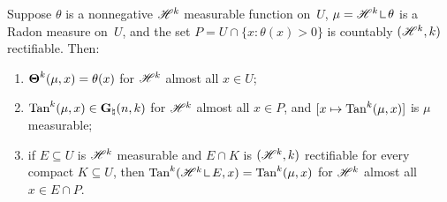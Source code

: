 \begin{lemma}[new\MS]
    \label{new:density_tangent}
    Suppose $\theta$ is a nonnegative $\mathscr{H}^{k}$ measurable function on~$U$, $\mu =
    \HM^{\vdim} \restrict \theta$ is a Radon measure on~$U$, and the set $P = U \cap \{ x :
    \theta(x) > 0 \}$ is countably $(\mathscr{H}^{k},k)$ rectifiable. Then:
    \begin{enumerate}
        \item $\boldsymbol{\Theta}^{k}(\mu,x) = \theta(x)$ for $\mathscr{H}^{k}$ almost all $x \in U$;
        \item $\operatorname{Tan}^{k}(\mu,x) \in \mathbf{G}_{\natural}(n,k)$ for $\mathscr{H}^{k}$ almost all $x \in
            P$, and $[x \mapsto \operatorname{Tan}^{k}(\mu,x)]$ is $\mu$ measurable;
        \item if $E \subseteq U$ is $\mathscr{H}^{k}$ measurable and $E \cap K$ is
            $(\mathscr{H}^{k},k)$ rectifiable for every compact $K \subseteq U$, then
            $\Tan^{\vdim}(\HM^{\vdim} \restrict E, x) = \Tan^{\vdim}(\mu,x)$ for $\mathscr{H}^{k}$
            almost all $x \in E \cap P$.
    \end{enumerate}
\end{lemma}

